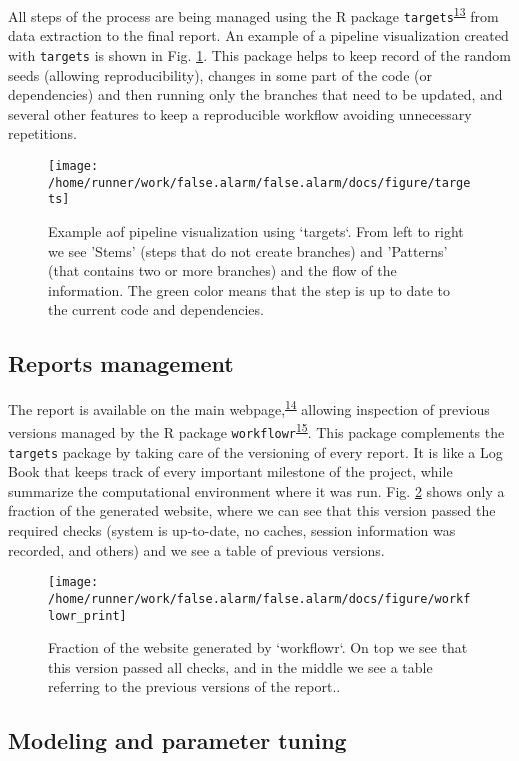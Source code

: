 \documentclass[12pt,twoside]{fmupthesis}
\begin{document}
All steps of the process are being managed using the R package \texttt{targets}\textsuperscript{\protect\hyperlink{ref-landau2021}{13}} from data
extraction to the final report. An example of a pipeline visualization created with \texttt{targets} is
shown in Fig. \ref{fig:targets}. This package helps to keep record of the random seeds (allowing
reproducibility), changes in some part of the code (or dependencies) and then running only the
branches that need to be updated, and several other features to keep a reproducible workflow
avoiding unnecessary repetitions.
\begin{figure}

{\centering \texttt{[image: /home/runner/work/false.alarm/false.alarm/docs/figure/targets]} 

}

\caption{Example aof pipeline visualization using `targets`. From left to right we see 'Stems' (steps that do not create branches) and 'Patterns' (that contains two or more branches) and the flow of the information. The green color means that the step is up to date to the current code and dependencies.}\label{fig:targets}
\end{figure}
\hypertarget{reports-management}{%
\subsection{Reports management}\label{reports-management}}

The report is available on the main webpage,\textsuperscript{\protect\hyperlink{ref-franz_website}{14}} allowing inspection of previous
versions managed by the R package \texttt{workflowr}\textsuperscript{\protect\hyperlink{ref-workflowr2021}{15}}. This package complements the
\texttt{targets} package by taking care of the versioning of every report. It is like a Log Book that keeps
track of every important milestone of the project, while summarize the computational environment
where it was run. Fig. \ref{fig:workflowr} shows only a fraction of the generated website, where we
can see that this version passed the required checks (system is up-to-date, no caches, session
information was recorded, and others) and we see a table of previous versions.
\begin{figure}

{\centering \texttt{[image: /home/runner/work/false.alarm/false.alarm/docs/figure/workflowr\_print]} 

}

\caption{Fraction of the website generated by `workflowr`. On top we see that this version passed all checks, and in the middle we see a table referring to the previous versions of the report..}\label{fig:workflowr}
\end{figure}
\hypertarget{modeling-and-parameter-tuning}{%
\subsection{Modeling and parameter tuning}\label{modeling-and-parameter-tuning}}
\end{document}
